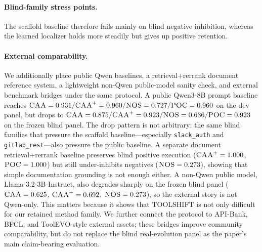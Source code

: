\paragraph{Blind-family stress points.}
\begin{center}
\small
{}
\end{center}
The scaffold baseline therefore fails mainly on blind negative inhibition, whereas the learned localizer holds \NOS{} more steadily but gives up positive retention.

\paragraph{External comparability.}
We additionally place public Qwen baselines, a retrieval+rerrank document reference system, a lightweight non-Qwen public-model sanity check, and external benchmark bridges under the same protocol. A public Qwen3-8B prompt baseline reaches $\textsc{CAA}=0.931 / \textsc{CAA}^{+}=0.960 / \textsc{NOS}=0.727 / \textsc{POC}=0.960$ on the dev panel, but drops to $\textsc{CAA}=0.875 / \textsc{CAA}^{+}=0.923 / \textsc{NOS}=0.636 / \textsc{POC}=0.923$ on the frozen blind panel. The drop pattern is not arbitrary: the same blind families that pressure the scaffold baseline---especially \texttt{slack\_auth} and \texttt{gitlab\_rest}---also pressure the public baseline. A separate document retrieval+rerrank baseline preserves blind positive execution ($\textsc{CAA}^{+}=1.000$, $\textsc{POC}=1.000$) but still under-inhibits negatives ($\textsc{NOS}=0.273$), showing that simple documentation grounding is not enough either. A non-Qwen public model, Llama-3.2-3B-Instruct, also degrades sharply on the frozen blind panel ($\textsc{CAA}=0.625$, $\textsc{CAA}^{+}=0.692$, $\textsc{NOS}=0.273$), so the external story is not Qwen-only. This matters because it shows that TOOLSHIFT is not only difficult for our retained method family. We further connect the protocol to API-Bank, BFCL, and ToolEVO-style external assets; these bridges improve community comparability, but do not replace the blind real-evolution panel as the paper's main claim-bearing evaluation.

